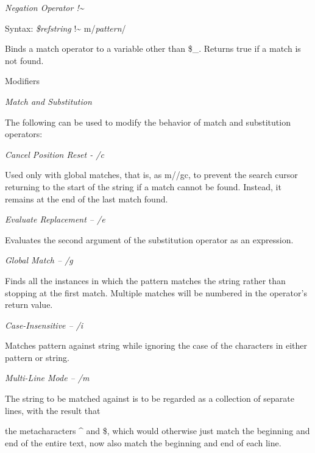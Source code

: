 \documentclass[a4paper,11pt]{book}
\begin{document}
\noindent 

\noindent \textit{Negation Operator  !\~{}}

\noindent Syntax: \textit{\$refstring }!\~{} m/\textit{pattern}/

\noindent 

\noindent Binds a match operator to a variable other than \$\_. Returns true if a match is not found.

\noindent 

\noindent Modifiers

\noindent 

\noindent 

\noindent \textit{Match and Substitution}

\noindent The following can be used to modify the behavior of match and substitution operators:

\noindent 

\noindent \textit{Cancel Position Reset - /c}

\noindent Used only with global matches, that is, as m//gc, to prevent the search cursor returning to the start of the string if a match cannot be found. Instead, it remains at the end of the last match found.

\noindent 

\noindent \textit{Evaluate Replacement -- /e}

\noindent Evaluates the second argument of the substitution operator as an expression.

\noindent 

\noindent \textit{Global Match -- /g}

\noindent Finds all the instances in which the pattern matches the string rather than stopping at the first match. Multiple matches will be numbered in the operator's return value.

\noindent 

\noindent \textit{Case-Insensitive -- /i}

\noindent Matches pattern against string while ignoring the case of the characters in either pattern or string.

\noindent \eject 

\noindent 

\noindent \textit{Multi-Line Mode -- /m}

\noindent The string to be matched against is to be regarded as a collection of separate lines, with the result that

\noindent the metacharacters \^{} and \$, which would otherwise just match the beginning and end of the entire text, now also match the beginning and end of each line.
\end{document}
